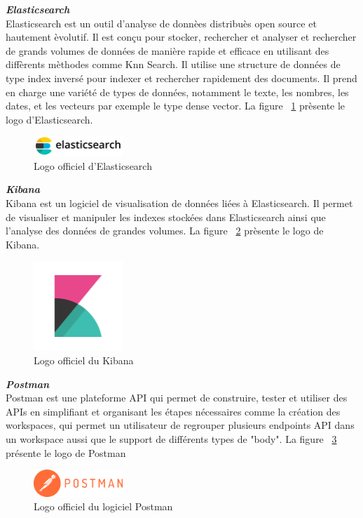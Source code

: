 \noindent
{\small\textbf{\textit{Elasticsearch}}}\mbox{}\\
Elasticsearch est un outil d'analyse de donnèes distribuès open source et hautement èvolutif. Il est conçu pour stocker, rechercher et analyser et rechercher de grands volumes de données de manière rapide et efficace en utilisant des diffèrents mèthodes comme Knn Search.
Il utilise une structure de données de type index inversé pour indexer et rechercher rapidement des documents. Il prend en charge une variété de types de données, notamment le texte, les nombres, les dates, et les vecteurs par exemple le type dense vector.
La figure ~\ref{fig:elasticsearch} prèsente le logo d'Elasticsearch.
\begin{figure}[H]
\centering
\includegraphics[width=0.3\textwidth]{logos/elasticsearch.png}
\caption{Logo officiel d'Elasticsearch}
\label{fig:elasticsearch}
\end{figure}

\noindent
{\small\textbf{\textit{Kibana}}}\mbox{}\\
Kibana est un logiciel de visualisation de données liées à Elasticsearch. Il permet de visualiser et manipuler les indexes stockées dans Elasticsearch ainsi que l'analyse des données de grandes volumes.
La figure ~\ref{fig:kibana} prèsente le logo de Kibana.
\begin{figure}[H]
\centering
\includegraphics[width=0.3\textwidth]{logos/kibana.png}
\caption{Logo officiel du Kibana}
\label{fig:kibana}
\end{figure}

\noindent
{\small\textbf{\textit{Postman}}}\mbox{}\\
Postman est une plateforme API qui permet de construire, tester et utiliser des APIs en simplifiant et organisant les étapes nécessaires comme la création des workspaces, qui permet un utilisateur de regrouper plusieurs endpoints API dans un workspace aussi que le support de différents types de "body". La figure ~\ref{fig:postman} présente le logo de Postman
\begin{figure}[H]
\centering
\includegraphics[width=0.3\textwidth]{logos/postman.png}
\caption{Logo officiel du logiciel Postman}
\label{fig:postman}
\end{figure}

